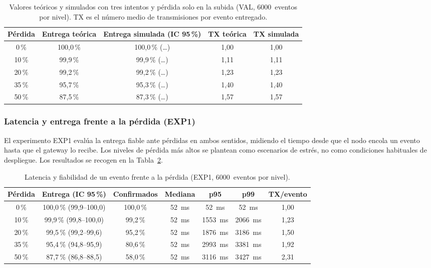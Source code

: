 \begin{table}[H]
\centering
\caption{\label{tab:teoria} Valores teóricos y simulados con tres intentos y pérdida solo en la subida (VAL, 6000~eventos por nivel). TX es el número medio de transmisiones por evento entregado.}
\small
\setlength{\tabcolsep}{4pt}
\begin{tabular}{|c|c|c|c|c|}
\hline
\textbf{Pérdida} & \textbf{Entrega teórica} & \textbf{Entrega simulada (IC 95\,\%)} & \textbf{TX teórica} & \textbf{TX simulada} \\
\hline
0\,\%  & 100,0\,\% & 100,0\,\% (\ldots) & 1,00 & 1,00 \\
\hline
10\,\% & 99,9\,\%  & 99,9\,\% (\ldots)  & 1,11 & 1,11 \\
\hline
20\,\% & 99,2\,\%  & 99,2\,\% (\ldots)  & 1,23 & 1,23 \\
\hline
35\,\% & 95,7\,\%  & 95,3\,\% (\ldots)  & 1,40 & 1,40 \\
\hline
50\,\% & 87,5\,\%  & 87,3\,\% (\ldots)  & 1,57 & 1,57 \\
\hline
\end{tabular}
\end{table}

\subsubsection{Latencia y entrega frente a la pérdida (EXP1)}\label{sec:latencia}

El experimento EXP1 evalúa la entrega fiable ante pérdidas en ambos sentidos, midiendo el tiempo desde que el nodo encola un evento hasta que el gateway lo recibe. Los niveles de pérdida más altos se plantean como escenarios de estrés, no como condiciones habituales de despliegue. Los resultados se recogen en la Tabla~\ref{tab:latencia}.



\begin{table}[H]
\centering
\caption{\label{tab:latencia} Latencia y fiabilidad de un evento frente a la pérdida (EXP1, 6000~eventos por nivel).}
\footnotesize
\setlength{\tabcolsep}{3pt}
\begin{tabular}{|c|c|c|c|c|c|c|}
\hline
\textbf{Pérdida} & \textbf{Entrega (IC 95\,\%)} & \textbf{Confirmados} & \textbf{Mediana} & \textbf{p95} & \textbf{p99} & \textbf{TX/evento} \\
\hline
0\,\%  & 100,0\,\% (99,9--100,0) & 100,0\,\% & 52~ms & 52~ms & 52~ms & 1,00 \\
\hline
10\,\% & 99,9\,\% (99,8--100,0) & 99,2\,\% & 52~ms & 1553~ms & 2066~ms & 1,23 \\
\hline
20\,\% & 99,5\,\% (99,2--99,6) & 95,2\,\% & 52~ms & 1876~ms & 3186~ms & 1,50 \\
\hline
35\,\% & 95,4\,\% (94,8--95,9) & 80,6\,\% & 52~ms & 2993~ms & 3381~ms & 1,92 \\
\hline
50\,\% & 87,7\,\% (86,8--88,5) & 58,0\,\% & 52~ms & 3116~ms & 3427~ms & 2,31 \\
\hline
\end{tabular}
\end{table}

